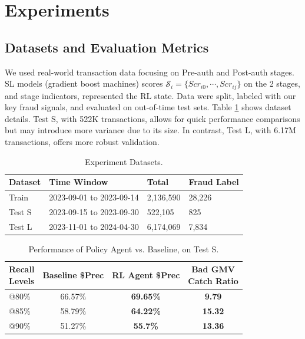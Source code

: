 \documentclass[11pt]{article}
\begin{document}
\section{Experiments}


\subsection{Datasets and Evaluation Metrics} 

We used real-world transaction data focusing on Pre-auth and Post-auth stages. SL models (gradient boost machines) scores $\mathcal{S}_i = \{Scr_{i0},\cdots,Scr_{ij}\}$ on the 2 stages, and stage indicators, represented the RL state. Data were split, labeled with our key fraud signals, and evaluated on out-of-time test sets. Table \ref{tab:DatasetInfo} shows dataset details. Test S, with 522K transactions, allows for quick performance comparisons but may introduce more variance due to its size. In contrast, Test L, with 6.17M transactions, offers more robust validation.

\begin{table}[t]
\small
\caption{Experiment Datasets.}
\centering
\begin{tabular}{lp{1.8cm}p{1.5cm}p{1.5cm}} %
    \toprule
    Dataset & Time Window & Total & Fraud Label \\
    \midrule
    Train & 2023-09-01 to 2023-09-14 & 2,136,590 & 28,226 \\ 
    Test S & 2023-09-15 to 2023-09-30 & 522,105 & 825 \\
    Test L & 2023-11-01 to 2024-04-30 & 6,174,069 & 7,834 \\
    \bottomrule
\end{tabular}
\label{tab:DatasetInfo}
\end{table}

\begin{table}[t]
\small
\caption{Performance of Policy Agent vs. Baseline, on Test S.}
\centering
\begin{tabular}{lccc}
    \toprule
    \makecell[l]{Recall \\ Levels} & \makecell[c]{Baseline \\ \$Prec} & \makecell[c]{RL Agent \\ \$Prec} & \makecell[c]{Bad GMV \\ Catch Ratio} \\
    \midrule
    @80\%   & 66.57\% & \textbf{69.65\%} & \textbf{9.79} \\ 
    @85\%   & 58.79\% & \textbf{64.22\%} & \textbf{15.32} \\ 
    @90\%   & 51.27\% & \textbf{55.7\%}  & \textbf{13.36} \\ 
    \bottomrule
\end{tabular}
\label{tab:Part1readout}
\end{table}
\end{document}
